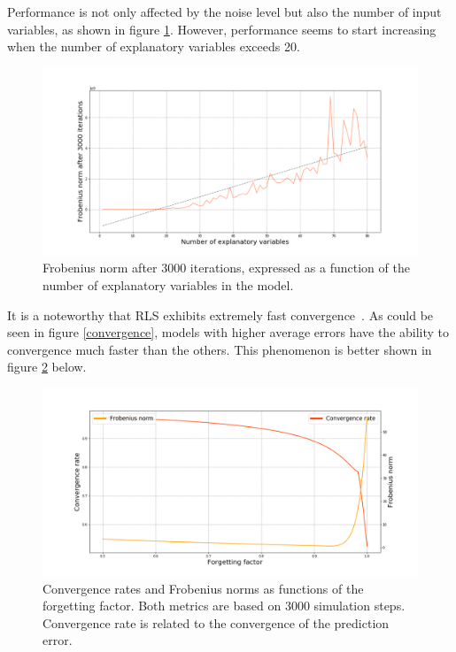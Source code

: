 Performance is not only affected by the noise level but also the number of
input variables, as shown in figure \ref{ninputs}. However, performance seems
to start increasing when the number of explanatory variables exceeds 20.

\begin{figure}[H]
    \begin{center}
        \includegraphics[width=\textwidth, keepaspectratio]{imgs/ninputs.png}
        \caption{Frobenius norm after 3000 iterations, expressed as a function of
            the number of explanatory variables in the model.}
        \label{ninputs}
    \end{center}
\end{figure}

It is a noteworthy that RLS exhibits extremely fast convergence~\cite{LIU2013476}.
As could be seen in figure \ref{convergence}, models with higher average errors
have the ability to convergence much faster than the others.
This phenomenon is better shown in figure \ref{convergencerate} below.

\begin{figure}[H]
    \begin{center}
        \includegraphics[width=\textwidth, keepaspectratio]{imgs/convergencerate.png}
        \caption{Convergence rates and Frobenius norms as functions of the forgetting factor.
            Both metrics are based on 3000 simulation steps. Convergence rate is related
            to the convergence of the prediction error.}
        \label{convergencerate}
    \end{center}
\end{figure}


